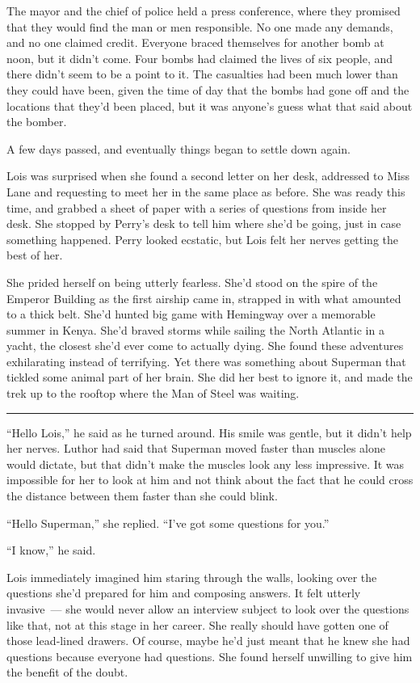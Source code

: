 The mayor and the chief of police held a press conference, where they
promised that they would find the man or men responsible. No one made
any demands, and no one claimed credit. Everyone braced themselves for
another bomb at noon, but it didn't come. Four bombs had claimed the
lives of six people, and there didn't seem to be a point to it. The
casualties had been much lower than they could have been, given the time
of day that the bombs had gone off and the locations that they'd been
placed, but it was anyone's guess what that said about the bomber.

A few days passed, and eventually things began to settle down again.

Lois was surprised when she found a second letter on her desk, addressed
to Miss Lane and requesting to meet her in the same place as before. She
was ready this time, and grabbed a sheet of paper with a series of
questions from inside her desk. She stopped by Perry's desk to tell him
where she'd be going, just in case something happened. Perry looked
ecstatic, but Lois felt her nerves getting the best of her.

She prided herself on being utterly fearless. She'd stood on the spire
of the Emperor Building as the first airship came in, strapped in with
what amounted to a thick belt. She'd hunted big game with Hemingway over
a memorable summer in Kenya. She'd braved storms while sailing the North
Atlantic in a yacht, the closest she'd ever come to actually dying. She
found these adventures exhilarating instead of terrifying. Yet there was
something about Superman that tickled some animal part of her brain. She
did her best to ignore it, and made the trek up to the rooftop where the
Man of Steel was waiting.

\begin{center}\rule{0.5\linewidth}{0.5pt}\end{center}

``Hello Lois,'' he said as he turned around. His smile was gentle, but
it didn't help her nerves. Luthor had said that Superman moved faster
than muscles alone would dictate, but that didn't make the muscles look
any less impressive. It was impossible for her to look at him and not
think about the fact that he could cross the distance between them
faster than she could blink.

``Hello Superman,'' she replied. ``I've got some questions for you.''

``I know,'' he said.

Lois immediately imagined him staring through the walls, looking over
the questions she'd prepared for him and composing answers. It felt
utterly invasive~--- she would never allow an interview subject to look
over the questions like that, not at this stage in her career. She
really should have gotten one of those lead‐lined drawers. Of course,
maybe he'd just meant that he knew she had questions because everyone
had questions. She found herself unwilling to give him the benefit of
the doubt.

